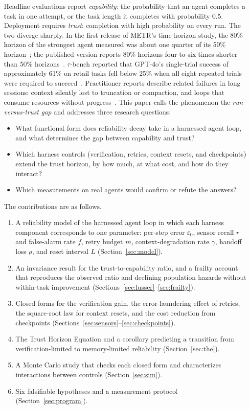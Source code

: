 \documentclass[journal]{IEEEtran}
\begin{document}
Headline evaluations report \emph{capability}: the probability that an agent completes a task in one attempt, or the task length it completes with probability 0.5. Deployment requires \emph{trust}: completion with high probability on every run. The two diverge sharply. In the first release of METR's time-horizon study, the 80\% horizon of the strongest agent measured was about one quarter of its 50\% horizon~\cite{kwa2025v1}; the published version reports 80\% horizons four to six times shorter than 50\% horizons~\cite{kwa2025}. $\tau$-bench reported that GPT-4o's single-trial success of approximately 61\% on retail tasks fell below 25\% when all eight repeated trials were required to succeed~\cite{yao2024}. Practitioner reports describe related failures in long sessions: context silently lost to truncation or compaction, and loops that consume resources without progress~\cite{faafo2026,mindstudio2026,openhands5355}. This paper calls the phenomenon the \emph{run-versus-trust gap} and addresses three research questions:

\begin{itemize}
  \item[RQ1] What functional form does reliability decay take in a harnessed agent loop, and what determines the gap between capability and trust?
  \item[RQ2] Which harness controls (verification, retries, context resets, and checkpoints) extend the trust horizon, by how much, at what cost, and how do they interact?
  \item[RQ3] Which measurements on real agents would confirm or refute the answers?
\end{itemize}

The contributions are as follows.
\begin{enumerate}
  \item A reliability model of the harnessed agent loop in which each harness component corresponds to one parameter: per-step error $\varepsilon_0$, sensor recall $r$ and false-alarm rate $f$, retry budget $m$, context-degradation rate $\gamma$, handoff loss $\rho$, and reset interval $L$ (Section~\ref{sec:model}).
  \item An invariance result for the trust-to-capability ratio, and a frailty account that reproduces the observed ratio and declining population hazards without within-task improvement (Sections~\ref{sec:lusser}--\ref{sec:frailty}).
  \item Closed forms for the verification gain, the error-laundering effect of retries, the square-root law for context resets, and the cost reduction from checkpoints (Sections~\ref{sec:sensors}--\ref{sec:checkpoints}).
  \item The Trust Horizon Equation and a corollary predicting a transition from verification-limited to memory-limited reliability (Section~\ref{sec:the}).
  \item A Monte Carlo study that checks each closed form and characterizes interactions between controls (Section~\ref{sec:sim}).
  \item Six falsifiable hypotheses and a measurement protocol (Section~\ref{sec:program}).
\end{enumerate}
\end{document}
